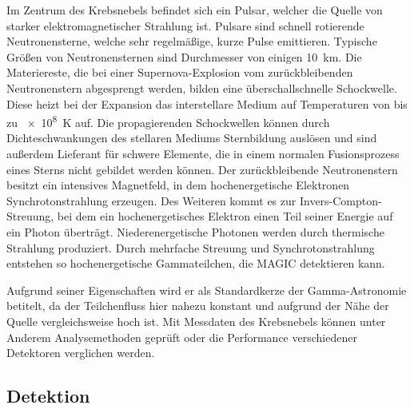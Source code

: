 Im Zentrum des Krebsnebels befindet sich ein Pulsar,
welcher die Quelle von starker elektromagnetischer Strahlung ist.
Pulsare sind schnell rotierende Neutronensterne,
welche sehr regelmäßige, kurze Pulse emittieren.
Typische Größen von Neutronensternen sind Durchmesser von einigen
\SI{10}{\kilo\meter}.
Die Materiereste, die bei einer Supernova-Explosion
vom zurückbleibenden Neutronenstern abgesprengt werden,
bilden eine überschallschnelle Schockwelle.
Diese heizt bei der Expansion das interstellare Medium auf Temperaturen von bis zu
\SI{e8}{\kelvin} auf.
Die propagierenden Schockwellen können durch Dichteschwankungen des stellaren
Mediums Sternbildung auslösen
und sind außerdem Lieferant für schwere Elemente, die in einem normalen
Fusionsprozess eines Sterns nicht gebildet werden können.
Der zurückbleibende Neutronenstern besitzt ein intensives Magnetfeld,
in dem hochenergetische Elektronen Synchrotonstrahlung erzeugen.
Des Weiteren kommt es zur Invers-Compton-Streuung,
bei dem ein hochenergetisches Elektron einen Teil seiner
Energie auf ein Photon überträgt.
Niederenergetische Photonen werden durch thermische Strahlung produziert.
Durch mehrfache Streuung und Synchrotonstrahlung entstehen so hochenergetische Gammateilchen,
die MAGIC detektieren kann.

Aufgrund seiner Eigenschaften wird er als Standardkerze der Gamma-Astronomie betitelt,
da der Teilchenfluss hier nahezu konstant und aufgrund der Nähe der Quelle vergleichsweise hoch ist.
Mit Messdaten des Krebsnebels können unter Anderem Analysemethoden geprüft
oder die Performance verschiedener Detektoren verglichen werden.

\subsection*{Detektion}%
\label{sub:wobbelmodus}



